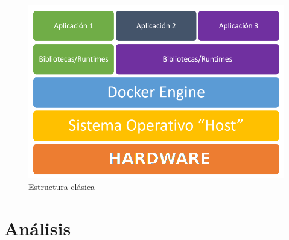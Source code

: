 \documentclass[11pt,a4paper]{article}
\begin{document}
\begin{figure}[H]
	\centering
	\includegraphics[scale=0.5]{images/estructura_docker_engine.png}
	\caption[Estructura de contenedores]{Estructura clásica}
	\label{fig:docker}
\end{figure}
\section{Análisis}
\end{document}
